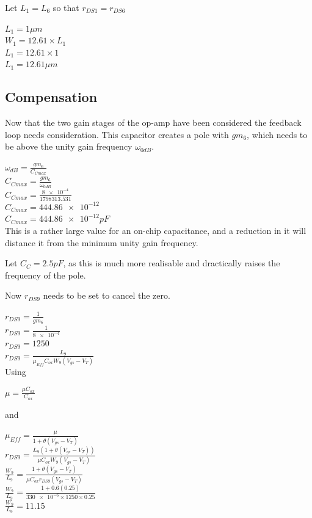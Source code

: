 Let $L_{1} = L_{6}$ so that $r_{DS1} = r_{DS6}$ 

$L_{1} = 1\mu m$ \\
$W_{1} = 12.61 \times L_{1}$ \\
$L_{1} = 12.61 \times 1$ \\
$L_{1} = 12.61\mu m$ \\

\subsection{Compensation}

Now that the two gain stages of the op-amp have been considered the feedback loop needs consideration.
This capacitor creates a pole with $gm_{6}$, which needs to be above the unity gain frequency $\omega_{0dB}$.

$\omega_{dB} = \frac{gm_{6}}{C_{Cmax}}$ \\
$C_{Cmax} = \frac{gm_{6}}{\omega_{0dB}}$ \\
$C_{Cmax} = \frac{\num{8e-4}}{1798313.531}$ \\
$C_{Cmax} = \num{444.86e-12}$ \\
$C_{Cmax} = \num{444.86e-12}pF$ \\

This is a rather large value for an on-chip capacitance, and a reduction in it will distance it from the minimum unity gain frequency.

Let $C_{C} = 2.5pF$, as this is much more realisable and dractically raises the frequency of the pole.

Now $r_{DS9}$ needs to be set to cancel the zero.

$r_{DS9} = \frac{1}{gm_{6}}$ \\
$r_{DS9} = \frac{1}{\num{8e-4}}$ \\
$r_{DS9} = 1250$ \\

$r_{DS9} = \frac{L_{9}}{\mu_{Eff}C_{ox}W_{9}(V_{gs} - V_{T})}$ \\

Using

$\mu = \frac{\mu C_{ox}}{C_{ox}}$

and

$\mu_{Eff} = \frac{\mu}{1 + \theta (V_{gs} - V_{T})}$ \\

$r_{DS9} = \frac{L_{9}(1 + \theta (V_{gs} - V_{T}))}{\mu C_{ox}W_{9}(V_{gs} - V_{T})}$ \\
$\frac{W_{9}}{L_{9}} = \frac{1 + \theta (V_{gs} - V_{T})}{\mu C_{ox}r_{DS9}(V_{gs} - V_{T})}$ \\
$\frac{W_{9}}{L_{9}} = \frac{1 + 0.6(0.25)}{\num{330e-6} \times 1250 \times 0.25}$ \\
$\frac{W_{9}}{L_{9}} = 11.15$ \\

